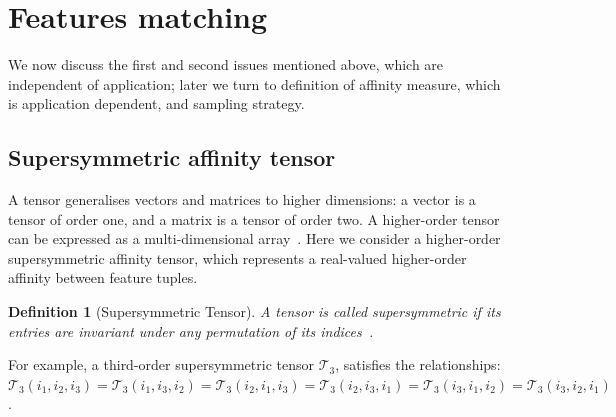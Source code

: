 \section{Features matching}
\label{sec:supersymhopm}
We now discuss the first and second issues mentioned above, which are independent of application; later we turn to definition of affinity measure, which is application dependent, and sampling strategy.

\subsection{Supersymmetric affinity tensor}
\label{subsec:supersymtensor}

A tensor generalises vectors and matrices to higher dimensions: a vector is a tensor of order one,
and a matrix is a tensor of order two. A higher-order tensor can be expressed as a multi-dimensional array~\cite{Kolda08}.
Here we consider a higher-order supersymmetric affinity tensor, which represents a real-valued higher-order affinity between feature tuples.

\newtheorem{mot}{Definition}
\begin{mot}[Supersymmetric Tensor]
\label{mot:def1}
A tensor is called supersymmetric if its entries are invariant under any permutation of its indices~\cite{Kofidis02}.
\end{mot}

For example, a third-order supersymmetric tensor $\mathcal{T}_3$, satisfies the relationships:
$\mathcal{T}_3(i_1, i_2, i_3)=\mathcal{T}_3(i_1, i_3, i_2)=\mathcal{T}_3(i_2, i_1, i_3)=\mathcal{T}_3(i_2, i_3, i_1)=\mathcal{T}_3(i_3, i_1, i_2)=\mathcal{T}_3(i_3, i_2, i_1)$.

